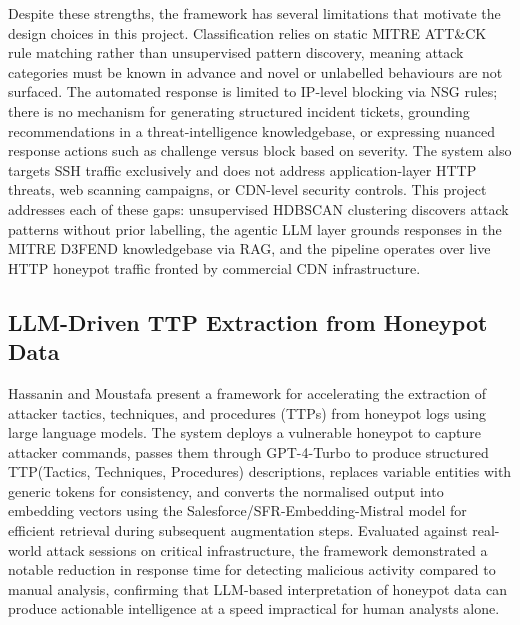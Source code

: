 \documentclass[12pt, a4paper]{report}   %
\begin{document}
Despite these strengths, the framework has several limitations that 
motivate the design choices in this project. Classification relies on 
static MITRE ATT\&CK rule matching rather than unsupervised pattern 
discovery, meaning attack categories must be known in advance and novel 
or unlabelled behaviours are not surfaced. The automated response is 
limited to IP-level blocking via NSG rules; there is no mechanism for 
generating structured incident tickets, grounding recommendations in a 
threat-intelligence knowledgebase, or expressing nuanced response 
actions such as challenge versus block based on severity. The system 
also targets SSH traffic exclusively and does not address 
application-layer HTTP threats, web scanning campaigns, or CDN-level 
security controls. This project addresses each of these gaps: 
unsupervised HDBSCAN clustering discovers attack patterns without prior 
labelling, the agentic LLM layer grounds responses in the MITRE D3FEND 
knowledgebase via RAG, and the pipeline operates over live HTTP 
honeypot traffic fronted by commercial CDN infrastructure.

\subsection{LLM-Driven TTP Extraction from Honeypot Data 
\cite{hassanin2024}}

Hassanin and Moustafa present a framework for accelerating the 
extraction of attacker tactics, techniques, and procedures (TTPs) from 
honeypot logs using large language models. The system deploys a 
vulnerable honeypot to capture attacker commands, passes them through 
GPT-4-Turbo to produce structured TTP(Tactics, Techniques, Procedures) descriptions, replaces variable 
entities with generic tokens for consistency, and converts the 
normalised output into embedding vectors using the 
Salesforce/SFR-Embedding-Mistral model for efficient retrieval during 
subsequent augmentation steps. Evaluated against real-world attack 
sessions on critical infrastructure, the framework demonstrated a 
notable reduction in response time for detecting malicious activity 
compared to manual analysis, confirming that LLM-based interpretation 
of honeypot data can produce actionable intelligence at a speed 
impractical for human analysts alone.
\end{document}
